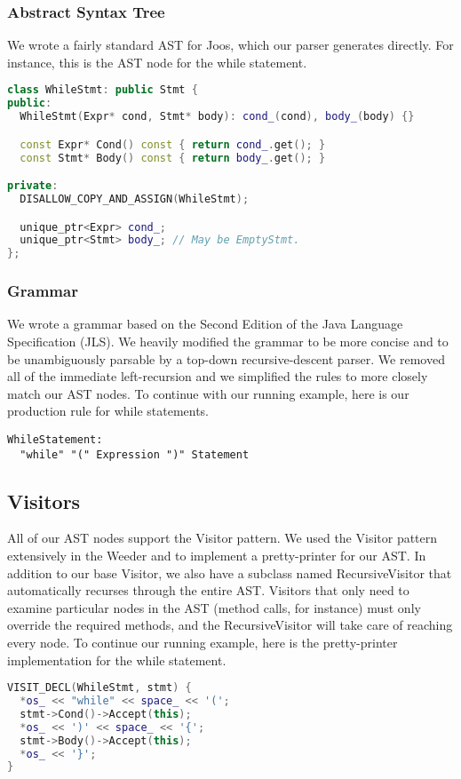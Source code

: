 \documentclass[12pt, titlepage]{article}
\begin{document}
\subsubsection{Abstract Syntax Tree}
We wrote a fairly standard AST for Joos, which our parser generates directly.
For instance, this is the AST node for the while statement.
\begin{lstlisting}[language=c++]
class WhileStmt: public Stmt {
public:
  WhileStmt(Expr* cond, Stmt* body): cond_(cond), body_(body) {}

  const Expr* Cond() const { return cond_.get(); }
  const Stmt* Body() const { return body_.get(); }

private:
  DISALLOW_COPY_AND_ASSIGN(WhileStmt);

  unique_ptr<Expr> cond_;
  unique_ptr<Stmt> body_; // May be EmptyStmt.
};
\end{lstlisting}

\subsubsection{Grammar}
We wrote a grammar based on the Second Edition of the Java Language
Specification (JLS). We heavily modified the grammar to be more concise and to
be unambiguously parsable by a top-down recursive-descent parser. We removed
all of the immediate left-recursion and we simplified the rules to more closely
match our AST nodes. To continue with our running example, here is our
production rule for while statements.
\begin{lstlisting}
WhileStatement:
  "while" "(" Expression ")" Statement
\end{lstlisting}

\subsection{Visitors}
All of our AST nodes support the Visitor pattern. We used the Visitor pattern
extensively in the Weeder and to implement a pretty-printer for our AST. In
addition to our base Visitor, we also have a subclass named RecursiveVisitor
that automatically recurses through the entire AST. Visitors that only need to
examine particular nodes in the AST (method calls, for instance) must only
override the required methods, and the RecursiveVisitor will take care of
reaching every node. To continue our running example, here is the
pretty-printer implementation for the while statement.
\begin{lstlisting}[language=c++]
VISIT_DECL(WhileStmt, stmt) {
  *os_ << "while" << space_ << '(';
  stmt->Cond()->Accept(this);
  *os_ << ')' << space_ << '{';
  stmt->Body()->Accept(this);
  *os_ << '}';
}
\end{lstlisting}
\end{document}
